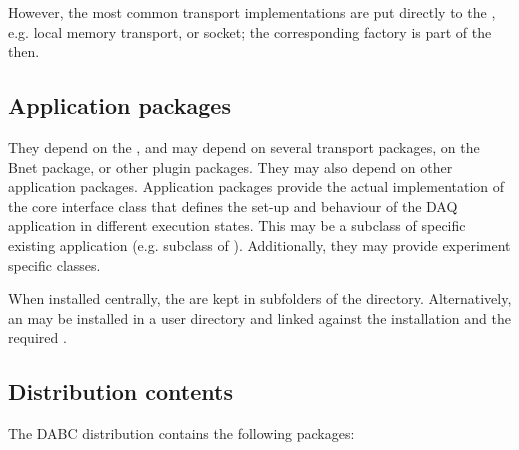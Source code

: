    However, the most common transport implementations are put 
   directly to the , e.g. local memory transport, or 
   socket; the corresponding factory is part of the  then. 
 
\subsection{Application packages}
They depend on the , and may depend 
on several transport packages, on the Bnet package, or other plugin packages. 
They may also depend on other application packages. 
Application packages provide the actual implementation of the core interface class
 that defines the set-up and behaviour of the DAQ application in 
different execution states. This may be a subclass of specific existing 
application (e.g. subclass of ). 
Additionally, they may provide experiment specific  classes.

When installed centrally, the  are kept in subfolders of the  
 directory. Alternatively, an  may be installed in a user directory and linked against the  installation and the required .


     
\subsection{Distribution contents}
The DABC distribution contains the following packages:

